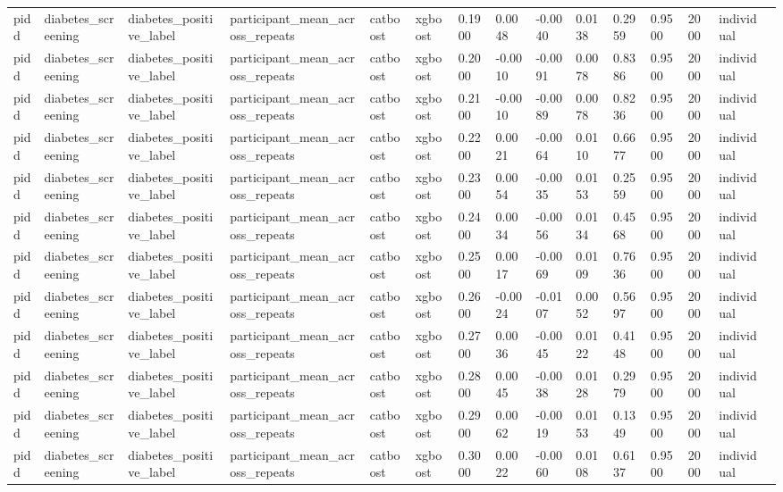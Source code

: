 \begin{tabular}{lllllllllllllll}
pidd & diabetes\_screening & diabetes\_positive\_label & participant\_mean\_across\_repeats & catboost & xgboost & 0.1900 & 0.0048 & -0.0040 & 0.0138 & 0.2959 & 0.9500 & 2000 & individual &  \\
pidd & diabetes\_screening & diabetes\_positive\_label & participant\_mean\_across\_repeats & catboost & xgboost & 0.2000 & -0.0010 & -0.0091 & 0.0078 & 0.8386 & 0.9500 & 2000 & individual &  \\
pidd & diabetes\_screening & diabetes\_positive\_label & participant\_mean\_across\_repeats & catboost & xgboost & 0.2100 & -0.0010 & -0.0089 & 0.0078 & 0.8236 & 0.9500 & 2000 & individual &  \\
pidd & diabetes\_screening & diabetes\_positive\_label & participant\_mean\_across\_repeats & catboost & xgboost & 0.2200 & 0.0021 & -0.0064 & 0.0110 & 0.6677 & 0.9500 & 2000 & individual &  \\
pidd & diabetes\_screening & diabetes\_positive\_label & participant\_mean\_across\_repeats & catboost & xgboost & 0.2300 & 0.0054 & -0.0035 & 0.0153 & 0.2559 & 0.9500 & 2000 & individual &  \\
pidd & diabetes\_screening & diabetes\_positive\_label & participant\_mean\_across\_repeats & catboost & xgboost & 0.2400 & 0.0034 & -0.0056 & 0.0134 & 0.4568 & 0.9500 & 2000 & individual &  \\
pidd & diabetes\_screening & diabetes\_positive\_label & participant\_mean\_across\_repeats & catboost & xgboost & 0.2500 & 0.0017 & -0.0069 & 0.0109 & 0.7636 & 0.9500 & 2000 & individual &  \\
pidd & diabetes\_screening & diabetes\_positive\_label & participant\_mean\_across\_repeats & catboost & xgboost & 0.2600 & -0.0024 & -0.0107 & 0.0052 & 0.5697 & 0.9500 & 2000 & individual &  \\
pidd & diabetes\_screening & diabetes\_positive\_label & participant\_mean\_across\_repeats & catboost & xgboost & 0.2700 & 0.0036 & -0.0045 & 0.0122 & 0.4148 & 0.9500 & 2000 & individual &  \\
pidd & diabetes\_screening & diabetes\_positive\_label & participant\_mean\_across\_repeats & catboost & xgboost & 0.2800 & 0.0045 & -0.0038 & 0.0128 & 0.2979 & 0.9500 & 2000 & individual &  \\
pidd & diabetes\_screening & diabetes\_positive\_label & participant\_mean\_across\_repeats & catboost & xgboost & 0.2900 & 0.0062 & -0.0019 & 0.0153 & 0.1349 & 0.9500 & 2000 & individual &  \\
pidd & diabetes\_screening & diabetes\_positive\_label & participant\_mean\_across\_repeats & catboost & xgboost & 0.3000 & 0.0022 & -0.0060 & 0.0108 & 0.6137 & 0.9500 & 2000 & individual &  \\

\end{tabular}
